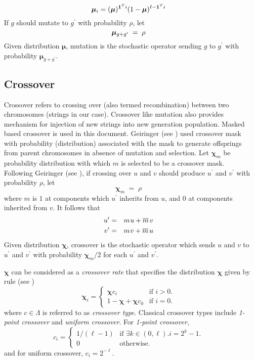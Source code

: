 \[
\bm{\mu}_i = (\bm{\mu})^{{\bf 1}^Ti} (1-\bm{\mu})^{\ell- {\bf 1}^Ti}
\]
If $g$ should mutate to $g^\prime$ with probability $\rho$,
let\\[-0.2in]
\[
\bm{\mu}_{g + g^\prime} \; = \; \rho\\[0.05in]
\]
Given distribution $\bm{\mu}$, mutation is the stochastic operator sending
$g$ to $g^\prime$ with probability $\bm{\mu}_{g + g^\prime}$.

\subsection{Crossover}
Crossover refers to crossing over (also termed recombination) between two chromosomes (strings in our case). Crossover like mutation also provides mechanism for injection of new strings into new generation population. Masked based crossover is used in this document. Geiringer (see \cite{Geiringer1944}) used crossover mask with probability (distribution) associated with the mask to generate offsprings from parent chromosomes in absence of mutation and selection. Let $\bm{\chi}_m$ be probability distribution with which $m$ is selected to be a crossover mask.
Following Geiringer (see \cite{Geiringer1944}), if crossing over $u$ and $v$ should produce $u^\prime$ and $v^\prime$ with probability $\rho$, let
\[
\bm{\chi}_m \; = \; \rho
\]
where $m$ is $1$ at components which $u^\prime$ inherits from $u$, and
$0$ at components inherited from $v$.  It follows that\\[-0.3in]
\begin{eqnarray*}
u^\prime & = & m \nudge u + \overline{m} \nudge\nudge v \\
v^\prime & = & m \nudge v + \overline{m} \nudge\nudge u
\end{eqnarray*}
Given distribution $\bm{\chi}$, crossover is the stochastic operator which
sends $u$ and $v$ to $u^\prime$ and $v^\prime$ with probability $\bm{\chi}_m/2$ for each $u^\prime$ and $v^\prime$.

$\bm{\chi}$ can be considered as a {\em crossover rate} that specifies the distribution $\bm{\chi}$ given by rule (see \cite{VoseWright1998})
\[
  \bm{\chi}_i =\begin{cases}
    \bm{\chi}  c_i & \text{if $i>0$}.\\
    1 - \bm{\chi} + \bm{\chi}  c_0 & \text{if $i = 0$}.
  \end{cases}
\]
where $c \in \Lambda$ is referred to as {\em crossover type}. Classical crossover types include {\em 1-point crossover} and {\em uniform crossover}. For {\em 1-point crossover},
\[
  c_i =\begin{cases}
    1/(\ell - 1) & \text{if $\exists k \in (0, \ell).i = 2^k - 1$}.\\
    0 & \text{otherwise}.
  \end{cases}
\]
and for uniform crossover, $c_i = 2^{-\ell}$.

